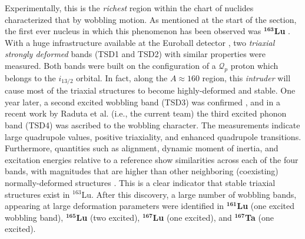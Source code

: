 Experimentally, this is the \emph{richest} region within the chart of nuclides characterized that by wobbling motion. As mentioned at the start of the section, the first ever nucleus in which this phenomenon has been observed was $^\mathbf{163}$\textbf{Lu} \cite{odegaard2001evidence}. With a huge infrastructure available at the Euroball detector \cite{simpson1997euroball}, two \emph{triaxial strongly deformed} bands (TSD1 and TSD2) with similar properties were measured. Both bands were built on the configuration of a $\mathcal{Q}_p$ proton which belongs to the $i_{13/2}$ orbital. In fact, along the $A\approx 160$ region, this \emph{intruder} will cause most of the triaxial structures to become highly-deformed and stable. One year later, a second excited wobbling band (TSD3) was confirmed \cite{jensen2002evidence}, and in a recent work by Raduta et al. (i.e., the current team) \cite{raduta2017semiclassical,raduta2020towards} the third excited phonon band (TSD4) was ascribed to the wobbling character. The measurements indicate large quadrupole values, positive triaxiality, and enhanced quadrupole transitions. Furthermore, quantities such as alignment, dynamic moment of inertia, and excitation energies relative to a reference show similarities across each of the four bands, with magnitudes that are higher than other neighboring (coexisting) normally-deformed structures \cite{jensen2004coexisting}. This is a clear indicator that stable triaxial structures exist in $^{163}$Lu. After this discovery, a large number of wobbling bands, appearing at large deformation parameters were identified in $^\mathbf{161}$\textbf{Lu} \cite{bringel2005evidence} (one excited wobbling band), $^\mathbf{165}$\textbf{Lu} \cite{schonwasser2003one} (two excited), $^\mathbf{167}$\textbf{Lu} \cite{amro2003wobbling} (one excited), and $^\mathbf{167}$\textbf{Ta} \cite{hartley2009wobbling} (one excited).

